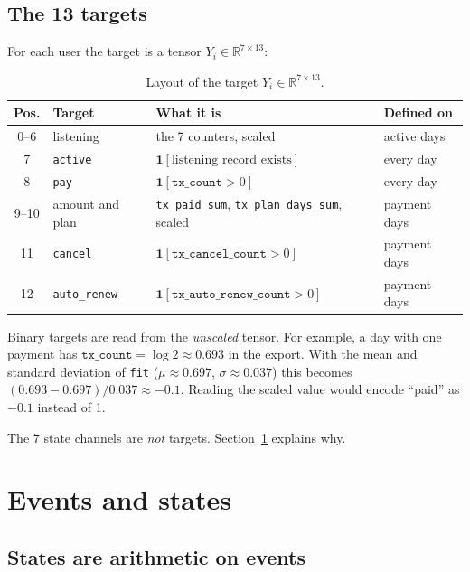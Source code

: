 \documentclass[11pt]{article}
\newcommand{\R}{\mathbb{R}}
\newcommand{\ind}{\mathbf{1}}
\newcommand{\code}[1]{\texttt{#1}}
\begin{document}
\subsection{The 13 targets}

For each user the target is a tensor $Y_i \in \R^{7 \times 13}$:

\begin{table}[H]
\centering
\renewcommand{\arraystretch}{1.2}
\begin{tabularx}{\textwidth}{clXl}
\toprule
\textbf{Pos.} & \textbf{Target} & \textbf{What it is} & \textbf{Defined on} \\
\midrule
0--6 & listening & the 7 counters, scaled & active days \\
7 & \code{active} & $\ind[\text{listening record exists}]$ & every day \\
8 & \code{pay} & $\ind[\code{tx\_count} > 0]$ & every day \\
9--10 & amount and plan & \code{tx\_paid\_sum}, \code{tx\_plan\_days\_sum}, scaled & payment days \\
11 & \code{cancel} & $\ind[\code{tx\_cancel\_count} > 0]$ & payment days \\
12 & \code{auto\_renew} & $\ind[\code{tx\_auto\_renew\_count} > 0]$ & payment days \\
\bottomrule
\end{tabularx}
\caption{Layout of the target $Y_i \in \R^{7 \times 13}$.}
\end{table}

Binary targets are read from the \emph{unscaled} tensor. For example, a day with one payment has $\code{tx\_count} = \log 2 \approx 0.693$ in the export. With the mean and standard deviation of \code{fit} ($\mu \approx 0.697$, $\sigma \approx 0.037$) this becomes $(0.693 - 0.697)/0.037 \approx -0.1$. Reading the scaled value would encode ``paid'' as $-0.1$ instead of 1.

The 7 state channels are \emph{not} targets. Section~\ref{sec:states} explains why.

\section{Events and states}
\label{sec:states}

\subsection{States are arithmetic on events}
\end{document}
